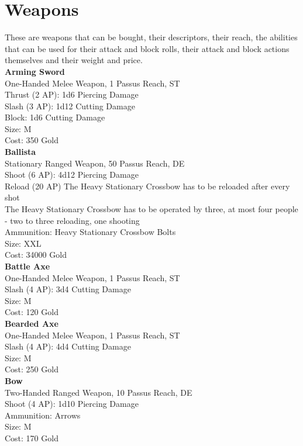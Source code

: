 \section{Weapons}
These are weapons that can be bought, their descriptors, their reach, the abilities that can be used for their attack and block rolls, their attack and block actions themselves and their weight and price.\\


\textbf{Arming Sword}\\
One-Handed Melee Weapon, 1 Passus Reach, ST\\
Thrust (2 AP): 1d6 Piercing Damage\\
Slash (3 AP): 1d12 Cutting Damage\\
Block: 1d6 Cutting Damage\\
Size: M\\
Cost: 350 Gold\\


\textbf{Ballista}\\
Stationary Ranged Weapon, 50 Passus Reach, DE\\
Shoot (6 AP): 4d12 Piercing Damage\\
Reload (20 AP) The Heavy Stationary Crossbow has to be reloaded after every shot\\
The Heavy Stationary Crossbow has to be operated by three, at most four people - two to three reloading, one shooting\\
Ammunition: Heavy Stationary Crossbow Bolts\\
Size: XXL\\
Cost: 34000 Gold\\


\textbf{Battle Axe}\\
One-Handed Melee Weapon, 1 Passus Reach, ST\\
Slash (4 AP): 3d4 Cutting Damage\\
Size: M\\
Cost: 120 Gold\\


\textbf{Bearded Axe}\\
One-Handed Melee Weapon, 1 Passus Reach, ST\\
Slash (4 AP): 4d4 Cutting Damage\\
Size: M\\
Cost: 250 Gold\\


\textbf{Bow}\\
Two-Handed Ranged Weapon, 10 Passus Reach, DE\\
Shoot (4 AP): 1d10 Piercing Damage\\
Ammunition: Arrows\\
Size: M\\
Cost: 170 Gold\\


